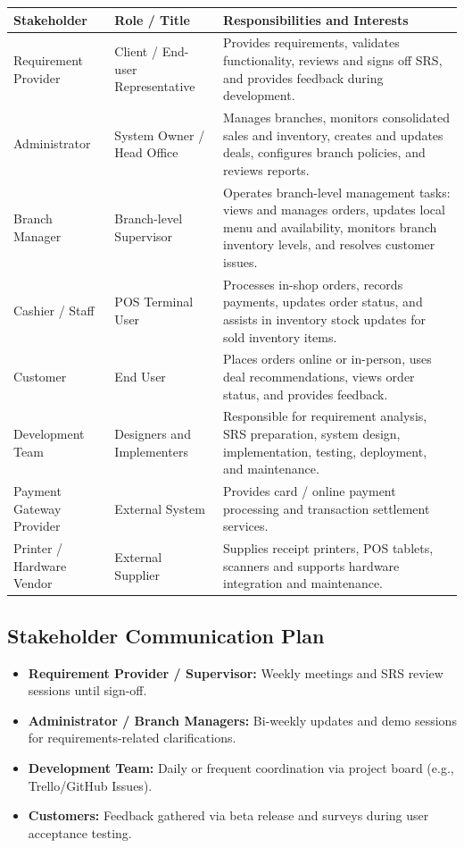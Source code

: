 \documentclass[12pt,a4paper]{article}
\begin{document}
\begin{longtable}{|p{3.2cm}|p{3.6cm}|p{5.0cm}|}
\hline
\textbf{Stakeholder} & \textbf{Role / Title} & \textbf{Responsibilities and Interests} \\
\hline
Requirement Provider & Client / End-user Representative & Provides requirements, validates functionality, reviews and signs off SRS, and provides feedback during development. \\
\hline
Administrator & System Owner / Head Office & Manages branches, monitors consolidated sales and inventory, creates and updates deals, configures branch policies, and reviews reports. \\
\hline
Branch Manager & Branch-level Supervisor & Operates branch-level management tasks: views and manages orders, updates local menu and availability, monitors branch inventory levels, and resolves customer issues. \\
\hline
Cashier / Staff & POS Terminal User & Processes in-shop orders, records payments, updates order status, and assists in inventory stock updates for sold inventory items. \\
\hline
Customer & End User & Places orders online or in-person, uses deal recommendations, views order status, and provides feedback. \\
\hline
Development Team & Designers and Implementers & Responsible for requirement analysis, SRS preparation, system design, implementation, testing, deployment, and maintenance. \\
\hline
Payment Gateway Provider & External System & Provides card / online payment processing and transaction settlement services. \\
\hline
Printer / Hardware Vendor & External Supplier & Supplies receipt printers, POS tablets, scanners and supports hardware integration and maintenance. \\
\hline
\end{longtable}

\subsection{Stakeholder Communication Plan }
\begin{itemize}
    \item \textbf{Requirement Provider / Supervisor:} Weekly meetings and SRS review sessions until sign-off.
    \item \textbf{Administrator / Branch Managers:} Bi-weekly updates and demo sessions for requirements-related clarifications.
    \item \textbf{Development Team:} Daily or frequent coordination via project board (e.g., Trello/GitHub Issues).
    \item \textbf{Customers:} Feedback gathered via beta release and surveys during user acceptance testing.
\end{itemize}
\end{document}
